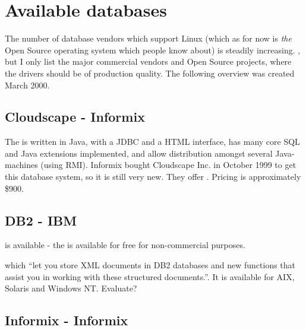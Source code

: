 \section{Available databases}
\label{sec:available-databases}

The number of database vendors which support Linux (which as for now
is \textit{the} Open Source operating system which people know about)
is steadily increasing.  , but I only list the major
commercial vendors and Open Source projects, where the drivers should
be of production quality.  The following overview was created March
2000.


\subsection{Cloudscape - Informix}
\label{sec:cloudscape}

The
 is written in Java, with a JDBC and a HTML interface, has
many core SQL and Java extensions implemented, and allow distribution
amongst several Java-machines (using RMI).  Informix bought Cloudscape
Inc. in October 1999 to get this database system, so it is still very
new.  They offer
.  Pricing is approximately \$900.


\subsection{DB2 - IBM}
\label{sec:db2}

is available - the  is available
for free for non-commercial purposes.  

 which ``let you store XML documents in DB2 databases
and new functions that assist you in working with these structured
documents.''.  It is available for AIX, Solaris and Windows NT.
  \textsf{Evaluate?} 

  

\subsection{Informix - Informix}
\label{sec:informix}

